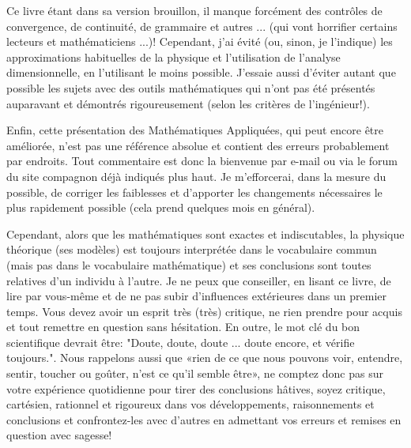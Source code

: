 	Ce livre étant dans sa version brouillon, il manque forcément des contrôles de convergence, de continuité, de grammaire et autres ... (qui vont horrifier certains lecteurs et mathématiciens ...)! Cependant, j'ai évité (ou, sinon, je l'indique) les approximations habituelles de la physique et l'utilisation de l'analyse dimensionnelle, en l'utilisant le moins possible. J'essaie aussi d'éviter autant que possible les sujets avec des outils mathématiques qui n'ont pas été présentés auparavant et démontrés rigoureusement (selon les critères de l'ingénieur!).
	
	Enfin, cette présentation des Mathématiques Appliquées, qui peut encore être améliorée, n'est pas une référence absolue et contient des erreurs probablement par endroits. Tout commentaire est donc la bienvenue par e-mail ou via le forum du site compagnon déjà indiqués plus haut. Je m'efforcerai, dans la mesure du possible, de corriger les faiblesses et d'apporter les changements nécessaires le plus rapidement possible (cela prend quelques mois en général).
	
	Cependant, alors que les mathématiques sont exactes et indiscutables, la physique théorique (ses modèles) est toujours interprétée dans le vocabulaire commun (mais pas dans le vocabulaire mathématique) et ses conclusions sont toutes relatives d'un individu à l'autre. Je ne peux que conseiller, en lisant ce livre, de lire par vous-même et de ne pas subir d'influences extérieures dans un premier temps. Vous devez avoir un esprit très (très) critique, ne rien prendre pour acquis et tout remettre en question sans hésitation. En outre, le mot clé du bon scientifique devrait être: "Doute, doute, doute ... doute encore, et vérifie toujours.". Nous rappelons aussi que «rien de ce que nous pouvons voir, entendre, sentir, toucher ou goûter, n'est ce qu'il semble être», ne comptez donc pas sur votre expérience quotidienne pour tirer des conclusions hâtives, soyez critique, cartésien, rationnel et rigoureux dans vos développements, raisonnements et conclusions et confrontez-les avec d'autres en admettant vos erreurs et remises en question avec sagesse!
	
